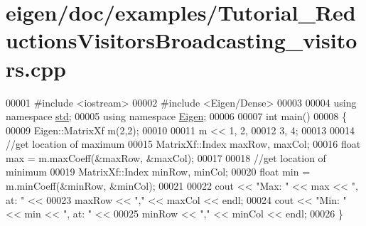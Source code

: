 \hypertarget{eigen_2doc_2examples_2_tutorial___reductions_visitors_broadcasting__visitors_8cpp_source}{}\section{eigen/doc/examples/\+Tutorial\+\_\+\+Reductions\+Visitors\+Broadcasting\+\_\+visitors.cpp}
\label{eigen_2doc_2examples_2_tutorial___reductions_visitors_broadcasting__visitors_8cpp_source}

\begin{DoxyCode}
00001 \textcolor{preprocessor}{#include <iostream>}
00002 \textcolor{preprocessor}{#include <Eigen/Dense>}
00003 
00004 \textcolor{keyword}{using namespace }\hyperlink{namespacestd}{std};
00005 \textcolor{keyword}{using namespace }\hyperlink{namespace_eigen}{Eigen};
00006 
00007 \textcolor{keywordtype}{int} main()
00008 \{
00009   Eigen::MatrixXf m(2,2);
00010   
00011   m << 1, 2,
00012        3, 4;
00013 
00014   \textcolor{comment}{//get location of maximum}
00015   MatrixXf::Index maxRow, maxCol;
00016   \textcolor{keywordtype}{float} max = m.maxCoeff(&maxRow, &maxCol);
00017 
00018   \textcolor{comment}{//get location of minimum}
00019   MatrixXf::Index minRow, minCol;
00020   \textcolor{keywordtype}{float} min = m.minCoeff(&minRow, &minCol);
00021 
00022   cout << \textcolor{stringliteral}{"Max: "} << max <<  \textcolor{stringliteral}{", at: "} <<
00023      maxRow << \textcolor{stringliteral}{","} << maxCol << endl;
00024   cout << \textcolor{stringliteral}{"Min: "} << min << \textcolor{stringliteral}{", at: "} <<
00025      minRow << \textcolor{stringliteral}{","} << minCol << endl;
00026 \}
\end{DoxyCode}

